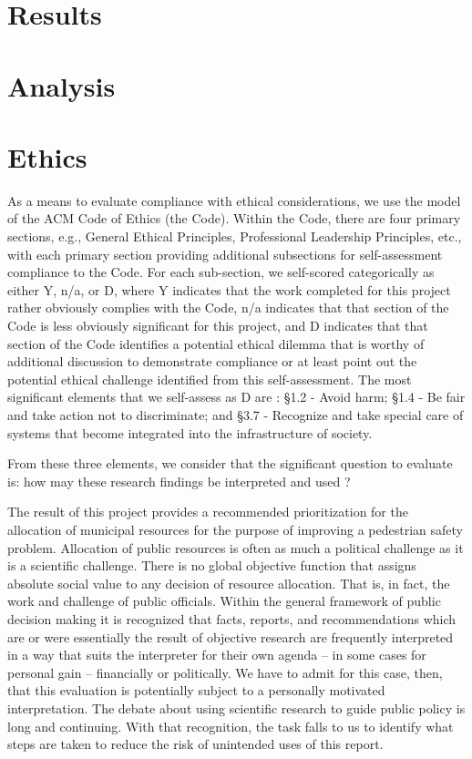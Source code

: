 \documentclass{llncs}
\begin{document}
\section{Results}
%
%
\section{Analysis}
%
%
\section{Ethics}
%
As a means to evaluate compliance with ethical considerations, we use the model of the ACM Code of Ethics  (the Code). Within the Code, there are four primary sections, e.g., General Ethical Principles, Professional Leadership Principles, etc., with each primary section providing additional subsections for self-assessment compliance to the Code. For each sub-section, we self-scored categorically as either Y, n/a, or D, where Y indicates that the work completed for this project rather obviously complies with the Code, n/a indicates that that section of the Code is less obviously significant for this project, and D indicates that that section of the Code identifies a potential ethical dilemma that is worthy of additional discussion to demonstrate compliance or at least point out the potential ethical challenge identified from this self-assessment.
The most significant elements that we self-assess as D are : \S 1.2 - Avoid harm; \S 1.4 - Be fair and take action not to discriminate; and \S 3.7 - Recognize and take special care of systems that become integrated into the infrastructure of society.

From these three elements, we consider that the significant question to evaluate is: how may these research findings be interpreted and used ?

The result of this project provides a recommended prioritization for the allocation of municipal resources for the purpose of improving a pedestrian safety problem. Allocation of  public resources is often as much a political challenge as it is a scientific challenge. There is no global objective function that assigns absolute social value to any decision of resource allocation. That is, in fact, the work and challenge of public officials. Within the general framework of public decision making it is recognized that facts, reports, and recommendations which are or were essentially the result of objective research are frequently interpreted in a way that suits the interpreter for their own agenda – in some cases for personal gain – financially or politically. We have to admit for this case, then, that this evaluation is potentially subject to a personally motivated interpretation. The debate about using scientific research to guide public policy is long and continuing. With that recognition, the task falls to us to identify what steps are taken to reduce the risk of unintended uses of this report.
\end{document}
